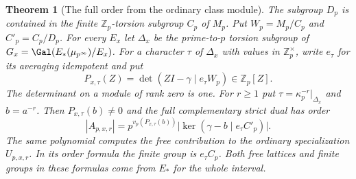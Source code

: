 \documentclass[a4paper,11pt]{article}
\newtheorem{theorem}[proposition]{Theorem}
\theoremstyle{definition}
\theoremstyle{remark}
\newcommand{\ZZ}{\mathbb Z}\newcommand{\ord}{\operatorname{ord}}
\numberwithin{equation}{section}
\begin{document}
\begin{theorem}[The full order from the ordinary class module]\leavevmode
\label{thm:unramdet330}
The subgroup \(D_p\) is contained in the finite \(\ZZ_p\)-torsion
subgroup \(C_p\) of \(M_p\). Put \(W_p=M_p/C_p\) and
\(C'_p=C_p/D_p\). For every \(E_x\) let \(\Delta_x\) be the
prime-to-\(p\) torsion subgroup of \(G_x=\Gal(E_*(\mu_{p^\infty})/E_x)\).
For a character \(\tau\) of \(\Delta_x\) with values in \(\ZZ_p^\times\),
write \(e_\tau\) for its averaging idempotent and put
\[
 P_{x,\tau}(Z)=\det(ZI-\gamma\mid e_\tau W_p)\in\ZZ_p[Z].
\]
The determinant on a module of rank zero is one. For \(r\ge1\)
put \(\tau=\kappa_p^{-r}|_{\Delta_x}\) and \(b=a^{-r}\). Then
\(P_{x,\tau}(b)\ne0\) and the full complementary strict dual has order
\begin{equation}\label{eq:unramdet330}
 |A_{p,x,r}|=
   p^{v_p(P_{x,\tau}(b))}
   \bigl|\ker(\gamma-b\mid e_\tau C'_p)\bigr|.
\end{equation}
The same polynomial computes the free contribution to the ordinary
specialization \(U_{p,x,r}\). In its order formula the finite
group is \(e_\tau C_p\). Both free lattices and finite groups in
these formulas come from \(E_*\) for the whole interval.
\end{theorem}
\end{document}
